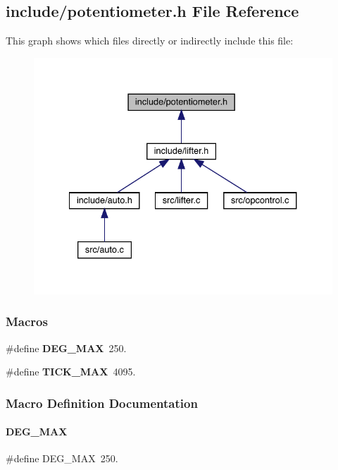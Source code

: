 \subsection{include/potentiometer.h File Reference}
\label{potentiometer_8h}
This graph shows which files directly or indirectly include this file\+:\nopagebreak
\begin{figure}[H]
\begin{center}
\leavevmode
\includegraphics[width=334pt]{potentiometer_8h__dep__incl}
\end{center}
\end{figure}
\subsubsection*{Macros}
\begin{DoxyCompactItemize}
\item 
\#define \textbf{ D\+E\+G\+\_\+\+M\+AX}~250.
\item 
\#define \textbf{ T\+I\+C\+K\+\_\+\+M\+AX}~4095.
\end{DoxyCompactItemize}


\subsubsection{Macro Definition Documentation}
\mbox{\label{potentiometer_8h_ab77b81696cf83be632fca5f56b4c3595}} 
\paragraph{D\+E\+G\+\_\+\+M\+AX}
{\footnotesize\ttfamily \#define D\+E\+G\+\_\+\+M\+AX~250.}



